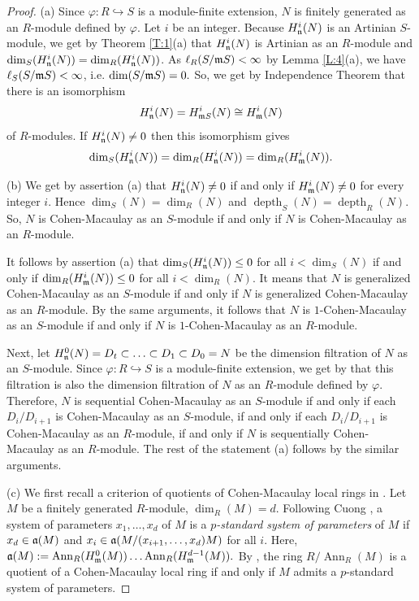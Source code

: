 \documentclass[a4papersize]{article}
\DeclareMathOperator{\depth}{depth}
\DeclareMathOperator{\Ann}{Ann}
\begin{document}
{\begin{proof} (a) Since $\varphi: R\hookrightarrow S$ is a module-finite extension, $N$ is finitely generated as an $R$-module defined by $\varphi$. Let $i$ be an integer. Because  $H^i_{\frak n}(N)$ is an Artinian $S$-module, we get by Theorem \ref{T:1}(a) that $H^i_{\frak n}(N)$ is Artinian as an $R$-module and  $\dim_S(H^i_{\frak n}(N))=\dim_R(H^i_{\frak n}(N))$. As $\ell_R(S/\frak mS)<\infty$ by Lemma \ref{L:4}(a), we have $\ell_S(S/\frak mS)<\infty$, i.e. $\dim(S/\frak mS)=0.$ So,  we get by Independence Theorem \cite[Theorem 4.2.1]{BS} that there  is an isomorphism  $$H^i_{\frak n}(N)=H^i_{\frak mS}(N)\cong  H^i_{\frak m}(N)$$  of $R$-modules.  If $H^i_{\frak n}(N)\neq 0$ then this isomorphism gives
$$\dim_S(H^i_{\frak n}(N))=\dim_R(H^i_{\frak n}(N))=\dim_R(H^i_{\frak m}(N)).$$
 		 
(b) We get by assertion (a) that $H^i_{\frak n}(N)\neq 0$ if and only if $H^i_{\frak m}(N)\neq 0$ for every integer $i$. Hence  $\dim_S(N)=\dim_R(N)$ and  $\depth_S(N)=\depth_R(N)$. So, $N$ is Cohen-Macaulay as an $S$-module if and only if $N$ is Cohen-Macaulay as an $R$-module.	
 		 
It follows by assertion (a) that  $\dim_S(H^i_{\frak n}(N))\leq 0$ for all $i<\dim_S(N)$ if and only if $\dim_R(H^i_{\frak m}(N))\leq 0$ for all $i<\dim_R(N).$ It means that $N$ is generalized Cohen-Macaulay as an $S$-module if and only if $N$ is generalized Cohen-Macaulay as an $R$-module. By the same arguments, it follows that  $N$ is $1$-Cohen-Macaulay as an $S$-module if and only if $N$ is $1$-Cohen-Macaulay as an $R$-module.
 		 		 
Next, let $H^0_{\frak n}(N)=D_t\subset \ldots \subset D_1\subset D_0=N$ be the dimension filtration of $N$ as an $S$-module.  Since $\varphi: R\hookrightarrow S$ is  a module-finite extension, we get by \cite[Theorem 3.3]{TPDA} that this filtration is also the dimension filtration of $N$ as an $R$-module defined by $\varphi$. Therefore, $N$ is  sequential Cohen-Macaulay as an $S$-module if and only if each $D_i/D_{i+1}$ is Cohen-Macaulay as an $S$-module, if and only if  each $D_i/D_{i+1}$ is Cohen-Macaulay as an $R$-module, if and only if $N$ is sequentially Cohen-Macaulay as an $R$-module. The rest of the statement (a) follows by the similar arguments.
 		
(c) We first recall a criterion of quotients of Cohen-Macaulay local rings in \cite{CC}. Let $M$ be a finitely generated $R$-module, $\dim_R(M)=d$.  Following Cuong \cite{C}, a system of parameters $x_1, \ldots , x_d$ of $M$ is  a {\it $p$-standard system of parameters}  of $M$ if $x_d\in \frak a(M)$ and $x_i\in\frak a(M/(x_{i+1}, \ldots , x_d)M)$ for all $i$. Here, $\frak a(M):=\Ann_R(H^0_{\frak m}(M))\ldots \Ann_R(H^{d-1}_{\frak m}(M)).$  By \cite[Theorems 1.2, 1.3]{CC}, the ring $R/\Ann_R(M)$ is a quotient of a Cohen-Macaulay local ring if and only if $M$ admits  a $p$-standard system of parameters.
 		

\end{proof}}
\end{document}
